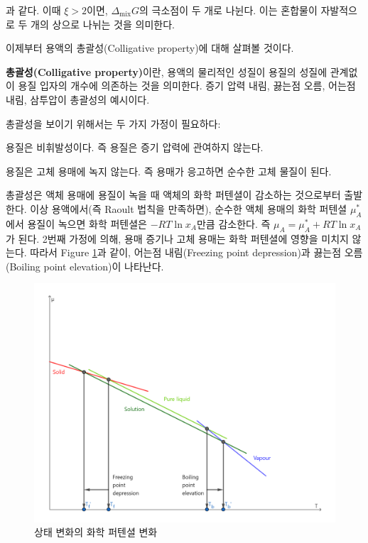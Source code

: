         과 같다. 이때 $\xi > 2$이면, $\Delta_\mathrm{mix}G$의 극소점이 두 개로 나뉜다. 이는 혼합물이 자발적으로 두 개의 상으로 나뉘는 것을 의미한다.
        \par 이제부터 용액의 총괄성(Colligative property)에 대해 살펴볼 것이다.
        \begin{defn}[총괄성]
        \textbf{총괄성(Colligative property)}이란, 용액의 물리적인 성질이 
        용질의 성질에 관계없이 용질 입자의 개수에 의존하는 것을 의미한다. 증기 압력 내림, 끓는점 오름, 어는점 내림, 삼투압이 총괄성의 예시이다.
        \end{defn}
        총괄성을 보이기 위해서는 두 가지 가정이 필요하다:
        \begin{enum}
            \item 용질은 비휘발성이다. 즉 용질은 증기 압력에 관여하지 않는다.
            \item 용질은 고체 용매에 녹지 않는다. 즉 용매가 응고하면 순수한 고체 물질이 된다. 
        \end{enum}
        총괄성은 액체 용매에 용질이 녹을 때 액체의 화학 퍼텐셜이 감소하는 것으로부터 출발한다. 이상 용액에서(즉 Raoult 법칙을 만족하면), 순수한 액체 용매의 
        화학 퍼텐셜 $\mu_A^\ast$에서 용질이 녹으면 화학 퍼텐셜은 $-RT\ln{x_A}$만큼 감소한다. 즉 $\mu_A = \mu_A^\ast + RT \ln{x_A}$가 된다. 2번째 가정에 의해, 
        용매 증기나 고체 용매는 화학 퍼텐셜에 영향을 미치지 않는다. 따라서 Figure \ref{f7}과 같이, 어는점 내림(Freezing point depression)과 
        끓는점 오름(Boiling point elevation)이 나타난다.
        \begin{figure}[H]
            \centering
            \includegraphics[scale=0.4]{Images/chempotcoll}
            \caption{상태 변화의 화학 퍼텐셜 변화}\label{f7}
        \end{figure}
